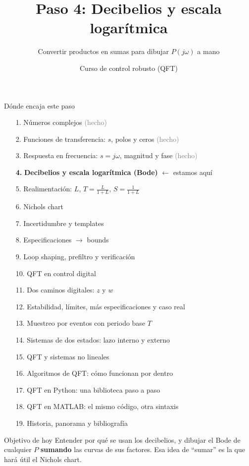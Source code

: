 \documentclass[aspectratio=169,11pt]{beamer}
\title[Decibelios y Bode]{Paso 4: Decibelios y escala logarítmica}
\subtitle{Convertir productos en sumas para dibujar $P(j\omega)$ a mano}
\author{Curso de control robusto (QFT)}
\date{}
\begin{document}
\begin{frame}\titlepage\end{frame}

\begin{frame}{Dónde encaja este paso}
  \tiny
  \begin{enumerate}\setlength{\itemsep}{-2pt}
    \item[1.] Números complejos \hfill \textcolor{gray}{(hecho)}
    \item[2.] Funciones de transferencia: $s$, polos y ceros \hfill \textcolor{gray}{(hecho)}
    \item[3.] Respuesta en frecuencia: $s=j\omega$, magnitud y fase \hfill \textcolor{gray}{(hecho)}
    \item[\textbf{4.}] \textbf{Decibelios y escala logarítmica (Bode)} \hfill $\leftarrow$ estamos aquí
    \item[5.] Realimentación: $L$, $T=\frac{L}{1+L}$, $S=\frac{1}{1+L}$
    \item[6.] Nichols chart
    \item[7.] Incertidumbre y templates
    \item[8.] Especificaciones $\rightarrow$ bounds
    \item[9.] Loop shaping, prefiltro y verificación
    \item[10.] QFT en control digital
    \item[11.] Dos caminos digitales: $z$ y $w$
    \item[12.] Estabilidad, límites, más especificaciones y caso real
    \item[13.] Muestreo por eventos con periodo base $T$
    \item[14.] Sistemas de dos estados: lazo interno y externo
    \item[15.] QFT y sistemas no lineales
    \item[16.] Algoritmos de QFT: cómo funcionan por dentro
    \item[17.] QFT en Python: una biblioteca paso a paso
    \item[18.] QFT en MATLAB: el mismo código, otra sintaxis
    \item[19.] Historia, panorama y bibliografía
  \end{enumerate}
  \vspace{4pt}
  \begin{block}{Objetivo de hoy}
    Entender por qué se usan los decibelios, y dibujar el Bode de cualquier $P$ \textbf{sumando} las curvas de sus factores. Esa idea de ``sumar'' es la que hará útil el Nichols chart.
  \end{block}
\end{frame}
\end{document}
